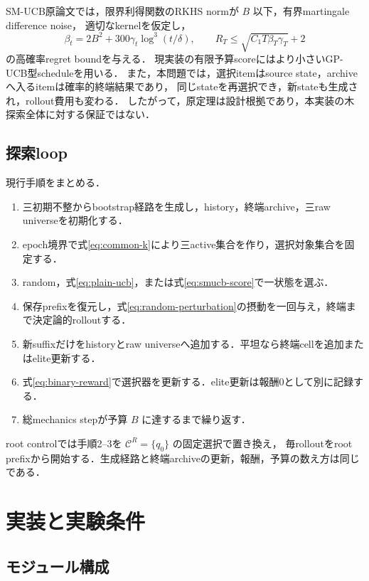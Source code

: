 \documentclass[a4paper,11pt]{ltjsarticle}
\begin{document}
SM-UCB原論文では，限界利得関数のRKHS normが \(B\) 以下，有界martingale difference noise，
適切なkernelを仮定し，
\begin{equation}
  \beta_t=2B^2+300\gamma_t\log^3(t/\delta),
  \qquad
  R_T\le\sqrt{C_1T\beta_T\gamma_T}+2
\end{equation}
の高確率regret boundを与える\citep{chen2017smucb}．
現実装の有限予算scoreにはより小さいGP-UCB型scheduleを用いる．
また，本問題では，選択itemはsource state，archiveへ入るitemは確率的終端結果であり，
同じstateを再選択でき，新stateも生成され，rollout費用も変わる．
したがって，原定理は設計根拠であり，本実装の木探索全体に対する保証ではない．

\subsection{探索loop}

現行手順をまとめる．
\begin{enumerate}
  \item 三初期不整からbootstrap経路を生成し，history，終端archive，三raw universeを初期化する．
  \item epoch境界で式\eqref{eq:common-k}により三active集合を作り，選択対象集合を固定する．
  \item random，式\eqref{eq:plain-ucb}，または式\eqref{eq:smucb-score}で一状態を選ぶ．
  \item 保存prefixを復元し，式\eqref{eq:random-perturbation}の摂動を一回与え，終端まで決定論的rolloutする．
  \item 新suffixだけをhistoryとraw universeへ追加する．平坦なら終端cellを追加またはelite更新する．
  \item 式\eqref{eq:binary-reward}で選択器を更新する．elite更新は報酬0として別に記録する．
  \item 総mechanics stepが予算 \(B\) に達するまで繰り返す．
\end{enumerate}
root controlでは手順2--3を \(\mathcal C^R=\{q_0\}\) の固定選択で置き換え，
毎rolloutをroot prefixから開始する．生成経路と終端archiveの更新，報酬，予算の数え方は同じである．

\section{実装と実験条件}
\label{sec:implementation}

\subsection{モジュール構成}
\end{document}
